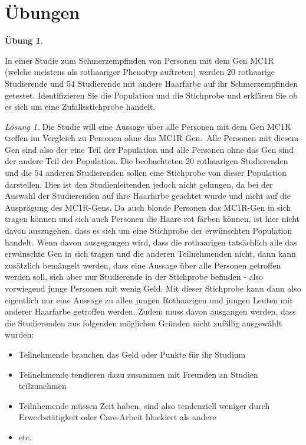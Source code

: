 \documentclass[
]{book}
\providecommand{\tightlist}{%
  \setlength{\itemsep}{0pt}\setlength{\parskip}{0pt}}
\theoremstyle{definition}
\theoremstyle{definition}
\theoremstyle{definition}
\newtheorem{exercise}{Übung}[chapter]
\theoremstyle{definition}
\theoremstyle{remark}
\newtheorem*{solution}{Lösung}
\begin{document}
\section{Übungen}\label{uxfcbungen}

\begin{exercise}
\protect\hypertarget{exr:redhair}{}\label{exr:redhair}\leavevmode

In einer Studie zum Schmerzempfinden von Personen mit dem Gen MC1R (welche meistens als rothaariger Phenotyp auftreten) werden \(20\) rothaarige Studierende und \(54\) Studierende mit andere Haarfarbe auf ihr Schmerzempfinden getestet. Identifizieren Sie die Population und die Stichprobe und erklären Sie ob es sich um eine Zufallsstichprobe handelt.

\end{exercise}

\begin{solution}

Die Studie will eine Aussage über alle Personen mit dem Gen MC1R treffen im Vergleich zu Personen ohne das MC1R Gen.~Alle Personen mit diesem Gen sind also der eine Teil der Population und alle Personen ohne das Gen sind der andere Teil der Population. Die beobachteten \(20\) rothaarigen Studierenden und die \(54\) anderen Studierenden sollen eine Stichprobe von dieser Population darstellen. Dies ist den Studienleitenden jedoch nicht gelungen, da bei der Auswahl der Studierenden auf ihre Haarfarbe geachtet wurde und nicht auf die Ausprägung des MC1R-Gens. Da auch blonde Personen das MC1R-Gen in sich tragen können und sich auch Personen die Haare rot färben können, ist hier nicht davon auszugehen, dass es sich um eine Stichprobe der erwünschten Population handelt. Wenn davon ausgegangen wird, dass die rothaarigen tatsächlich alle das erwünschte Gen in sich tragen und die anderen Teilnehmenden nicht, dann kann zusätzlich bemängelt werden, dass eine Aussage über alle Personen getroffen werden soll, sich aber nur Studierende in der Stichprobe befinden - also vorwiegend junge Personen mit wenig Geld. Mit dieser Stichprobe kann dann also eigentlich nur eine Aussage zu allen jungen Rothaarigen und jungen Leuten mit anderer Haarfarbe getroffen werden. Zudem muss davon ausgangen werden, dass die Studierenden aus folgenden möglichen Gründen nicht zufällig ausgewählt wurden:

\begin{itemize}
\tightlist
\item
  Teilnehmende brauchen das Geld oder Punkte für ihr Studium
\item
  Teilnehmende tendieren dazu zusammen mit Freunden an Studien teilzunehmen
\item
  Teilnhemende müssen Zeit haben, sind also tendenziell weniger durch Erwerbstätigkeit oder Care-Arbeit blockiert als andere
\item
  etc.
\end{itemize}

\end{solution}
\end{document}
